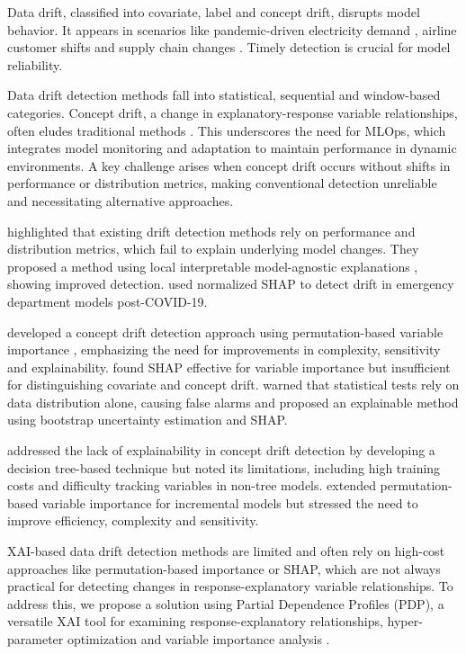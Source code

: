 Data drift, classified into covariate, label and concept drift, disrupts model behavior. It appears in scenarios like pandemic-driven electricity demand \citep{fumagalli_et_al_2023}, airline customer shifts \citep{garg_et_al_2021} and supply chain changes \citep{kulinski_and_inouye_2023}. Timely detection is crucial for model reliability.

Data drift detection methods fall into statistical, sequential and window-based categories. Concept drift, a change in explanatory-response variable relationships, often eludes traditional methods \citep{demvsar_and_bosnic_2018, duckworth_et_al_2021, rahmani_et_al_2023}. This underscores the need for MLOps, which integrates model monitoring and adaptation to maintain performance in dynamic environments. A key challenge arises when concept drift occurs without shifts in performance or distribution metrics, making conventional detection unreliable and necessitating alternative approaches.

\cite{demvsar_and_bosnic_2018} highlighted that existing drift detection methods rely on performance and distribution metrics, which fail to explain underlying model changes. They proposed a method using local interpretable model-agnostic explanations \citep{strumbelj_et_al_2009}, showing improved detection. \cite{duckworth_et_al_2021} used normalized SHAP \citep{lundberg_2017} to detect drift in emergency department models post-COVID-19.

\cite{muschalik_et_al_2022} developed a concept drift detection approach using permutation-based variable importance \citep{breiman2001random}, emphasizing the need for improvements in complexity, sensitivity and explainability. \cite{rahmani_et_al_2023} found SHAP effective for variable importance but insufficient for distinguishing covariate and concept drift. \cite{mougan_and_nielsen_2023} warned that statistical tests rely on data distribution alone, causing false alarms and proposed an explainable method using bootstrap uncertainty estimation and SHAP.

\cite{mattos_et_al_2021} addressed the lack of explainability in concept drift detection by developing a decision tree-based technique but noted its limitations, including high training costs and difficulty tracking variables in non-tree models. \cite{fumagalli_et_al_2023} extended permutation-based variable importance for incremental models but stressed the need to improve efficiency, complexity and sensitivity.

XAI-based data drift detection methods are limited and often rely on high-cost approaches like permutation-based importance or SHAP, which are not always practical for detecting changes in response-explanatory variable relationships. To address this, we propose a solution using Partial Dependence Profiles (PDP), a versatile XAI tool for examining response-explanatory relationships, hyper-parameter optimization \citep{moosbauer_et_al_2021} and variable importance analysis \citep{inglis_et_al_2022}.

